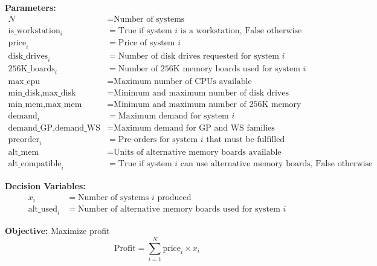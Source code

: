 \documentclass{article}
\begin{document}
\textbf{Parameters:}
\begin{align*}
N &= \text{Number of systems} \\
\text{is\_workstation}_i &= \text{True if system } i \text{ is a workstation, False otherwise} \\
\text{price}_i &= \text{Price of system } i \\
\text{disk\_drives}_i &= \text{Number of disk drives requested for system } i \\
\text{256K\_boards}_i &= \text{Number of 256K memory boards used for system } i \\
\text{max\_cpu} &= \text{Maximum number of CPUs available} \\
\text{min\_disk}, \text{max\_disk} &= \text{Minimum and maximum number of disk drives available} \\
\text{min\_mem}, \text{max\_mem} &= \text{Minimum and maximum number of 256K memory boards available} \\
\text{demand}_i &= \text{Maximum demand for system } i \\
\text{demand\_GP}, \text{demand\_WS} &= \text{Maximum demand for GP and WS families} \\
\text{preorder}_i &= \text{Pre-orders for system } i \text{ that must be fulfilled} \\
\text{alt\_mem} &= \text{Units of alternative memory boards available} \\
\text{alt\_compatible}_i &= \text{True if system } i \text{ can use alternative memory boards, False otherwise}
\end{align*}

\textbf{Decision Variables:}
\begin{align*}
x_i &= \text{Number of systems } i \text{ produced} \\
\text{alt\_used}_i &= \text{Number of alternative memory boards used for system } i
\end{align*}

\textbf{Objective:} Maximize profit
\[
\text{Profit} = \sum_{i=1}^{N} \text{price}_i \times x_i
\]
\end{document}
